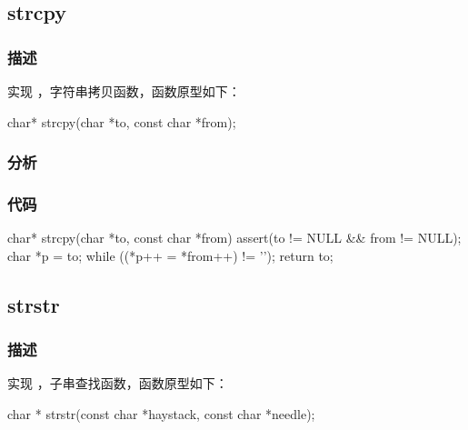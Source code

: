 
\subsection{strcpy}


\subsubsection{描述}
实现 ，字符串拷贝函数，函数原型如下：
\begin{Code}
char* strcpy(char *to, const char *from);
\end{Code}


\subsubsection{分析}



\subsubsection{代码}
\begin{Code}
char* strcpy(char *to, const char *from) {
    assert(to != NULL && from != NULL);
    char *p = to;
    while ((*p++ = *from++) != '\0');
    return to;
}
\end{Code}


\subsection{strstr}


\subsubsection{描述}
实现 ，子串查找函数，函数原型如下：
\begin{Code}
char * strstr(const char *haystack, const char *needle);
\end{Code}


